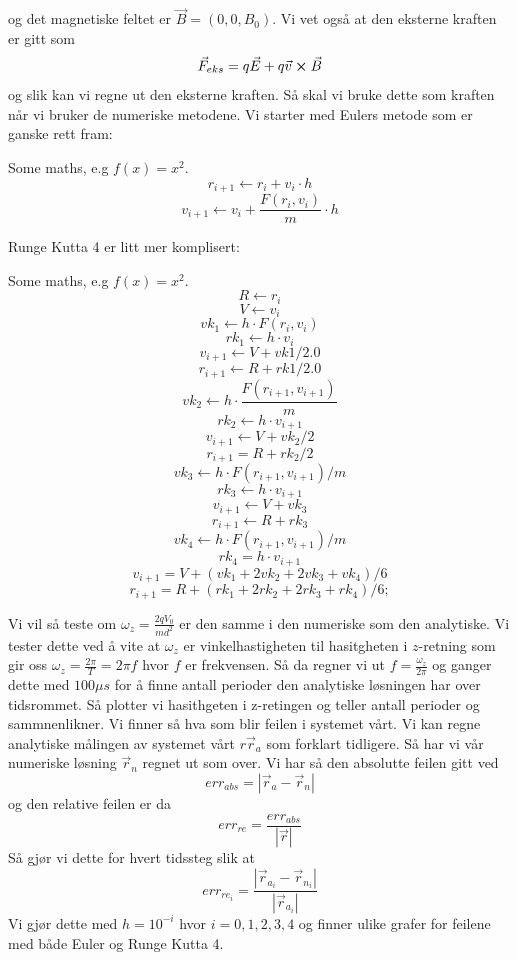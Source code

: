 \documentclass[reprint,english,notitlepage]{revtex4-1}  %
\begin{document}
og det magnetiske feltet er $\vec{B}=(0,0,B_0)$. Vi vet også at den eksterne kraften er gitt som
$$
\vec{F}_{eks}=q\vec{E}+q\vec{v}\cross \vec{B}
$$
og slik kan vi regne ut den eksterne kraften.
Så skal vi bruke dette som kraften når vi bruker de numeriske metodene.
Vi starter med Eulers metode som er ganske rett fram:
\begin{algorithm}[H]
	\begin{algorithmic}
		\State Some maths, e.g $f(x) = x^2$. 
		\State $$
		r_{i+1}\leftarrow r_i+v_i \cdot h
		$$
		\State $$
		v_{i+1}\leftarrow v_i+\frac{F(r_i, v_i)}{m}\cdot h
		$$
		\EndFor
	\end{algorithmic}
\end{algorithm}
Runge Kutta 4 er litt mer komplisert:
\begin{algorithm}[H]
	\begin{algorithmic}
		\State Some maths, e.g $f(x) = x^2$. 
		\For{$i = 0, 1, ..., N-1$}
		\State $$
		R\leftarrow r_i
		$$$$
		V\leftarrow v_i
		$$$$
		vk_1\leftarrow h\cdot F(r_i, v_i)
		$$$$
		rk_1\leftarrow h\cdot v_i
		$$$$
		v_{i+1}\leftarrow V+vk1/2.0
		$$$$
		r_{i+1}\leftarrow R+rk1/2.0
		$$
		$$
		vk_2\leftarrow h\cdot \frac{F(r_{i+1},v_{i+1})}{m}
		$$$$
		rk_2\leftarrow h\cdot v_{i+1}
		$$
		$$
		v_{i+1}\leftarrow V+vk_2/2
		$$$$
		r_{i+1}=R+rk_2/2
		$$
		$$
		vk_3\leftarrow h\cdot F(r_{i+1}, v_{i+1})/m
		$$$$
		rk_3\leftarrow h\cdot v_{i+1}
		$$
		$$
		v_{i+1}\leftarrow V+vk_3$$$$
		r_{i+1}\leftarrow R+rk_3
		$$
		$$
		vk_4\leftarrow h\cdot  F(r_{i+1}, v_{i+1})/m$$$$
		rk_4=h\cdot v_{i+1}
		$$
		$$
		v_{i+1}=V+(vk_1+2vk_2+2vk_3+vk_4)/6$$$$
		r_{i+1}=R+(rk_1+2rk_2+2rk_3+rk_4)/6;
		$$
		\EndFor
	\end{algorithmic}
\end{algorithm}
Vi vil så teste om $\omega_z=\frac{2qV_0}{md^2}$ er den samme i den numeriske som den analytiske. Vi tester dette ved å vite at $\omega_z$ er vinkelhastigheten til hasitgheten i $z$-retning som gir oss $\omega_z=\frac{2\pi}{T}=2\pi f$ hvor $f$ er frekvensen. Så da regner vi ut $f=\frac{\omega_z}{2\pi}$ og ganger dette med $100\mu s$ for å finne antall perioder den analytiske løsningen har over tidsrommet. Så plotter vi hasithgeten i z-retingen og teller antall perioder og sammnenlikner.
Vi finner så hva som blir feilen i systemet vårt. Vi kan regne analytiske målingen av systemet vårt $r\vec{r}_a$ som forklart tidligere. Så har vi vår numeriske løsning $\vec{r}_n$ regnet ut som over. Vi har så den absolutte feilen gitt ved
$$
err_{abs}=|\vec{r}_{a}-\vec{r}_{n}|
$$
og den relative feilen er da
$$
err_{re}=\frac{err_{abs}}{|\vec{r}|}
$$
Så gjør vi dette for hvert tidssteg slik at
$$
err_{re_i}=\frac{|\vec{r}_{a_i}-\vec{r}_{n_i}|}{|\vec{r}_{a_i}|}
$$
Vi gjør dette med $h=10^{-i}$ hvor $i=0,1,2,3,4$ og finner ulike grafer for feilene med både Euler og Runge Kutta 4.
\end{document}
